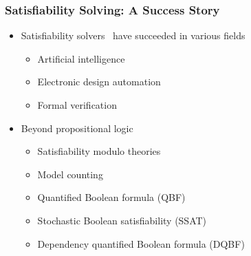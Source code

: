 \begin{frame}
      \frametitle{Satisfiability Solving: A Success Story}
      \begin{itemize}
            \item Satisfiability solvers~\cite{SATHandbook} have succeeded in various fields
                  \begin{itemize}
                        \item Artificial intelligence~\cite{Nilsson2014,Russell2020}
                        \item Electronic design automation~\cite{Marques2000,Wang2009}
                        \item Formal verification~\cite{Berard2013,Jhala2009}
                  \end{itemize}
                  \pause
            \item Beyond propositional logic
                  \begin{itemize}
                        \item Satisfiability modulo theories~\cite{Moura2011,HBMC-SMT}
                        \item Model counting~\cite{SATHandbook-ModelCounting}
                        \item Quantified Boolean formula (QBF)~\cite{Narizzano2006,SATHandbook-QBF}
                        \item Stochastic Boolean satisfiability (SSAT)~\cite{Littman2001,SATHandbook-SSAT}
                        \item Dependency quantified Boolean formula (DQBF)~\cite{Balabanov2014,Scholl2018}
                  \end{itemize}
      \end{itemize}
\end{frame}

